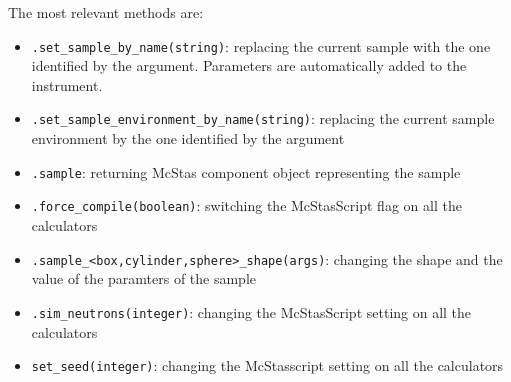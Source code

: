 \documentclass[11pt, a4paper]{article}
\begin{document}
The most relevant methods are:
\begin{itemize}
\item \verb|.set_sample_by_name(string)|: replacing the current sample with the one identified by the argument. Parameters are automatically added to the instrument.
\item \verb|.set_sample_environment_by_name(string)|: replacing the current sample environment by the one identified by the argument
\item \verb|.sample|: returning McStas component object representing the sample
\item \verb|.force_compile(boolean)|: switching the McStasScript flag on all the calculators
\item \verb|.sample_<box,cylinder,sphere>_shape(args)|: changing the shape and the value of the paramters of the sample
\item \verb|.sim_neutrons(integer)|: changing the McStasScript setting on all the calculators
\item \verb|set_seed(integer)|: changing the McStasscript setting on all the calculators
\end{itemize}
\end{document}
